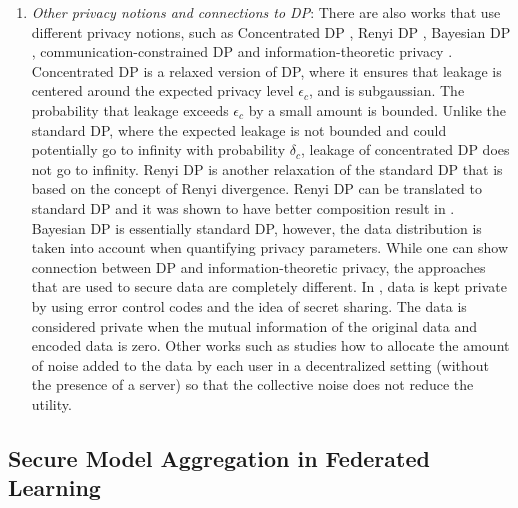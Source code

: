 \begin{enumerate}
\item \textit{Other privacy notions and connections to DP}: There are also works that use different privacy notions, such as Concentrated DP \cite{Dwork2016CDP, Bun2016zCDP}, Renyi DP \cite{RDP}, Bayesian DP \cite{Triastcyn2019Bayesian}, communication-constrained DP \cite{Girgis2021ShuffledModel} and information-theoretic privacy \cite{so2021codedprivateml}. Concentrated DP is a relaxed version of DP, where it ensures that leakage is centered around the expected privacy level $\epsilon_c$, and is subgaussian. The probability that leakage exceeds $\epsilon_c$ by a small amount is bounded. Unlike the standard DP, where the expected leakage is not bounded and could potentially go to infinity with probability $\delta_c$, leakage of concentrated DP does not go to infinity. Renyi DP is another relaxation of the standard DP that is based on the concept of Renyi divergence. Renyi DP can be translated to standard DP and it was shown to have better composition result in \cite{RDP}. Bayesian DP is essentially standard DP, however, the data distribution is taken into account when quantifying privacy parameters. While one can show connection between DP and information-theoretic privacy, the approaches that are used to secure data are completely different. In \cite{so2021codedprivateml}, data is kept private by using error control codes and the idea of secret sharing. The data is considered private when the mutual information of the original data and encoded data is zero. Other works such as \cite{Guo2020DPDecentralizedLearning} studies how to allocate the amount of noise added to the data by each user in a decentralized setting (without the presence of a server) so that the collective noise does not reduce the utility.
\end{enumerate}

\subsection{Secure Model Aggregation in Federated Learning}\label{sec:securemodelaggregation}

